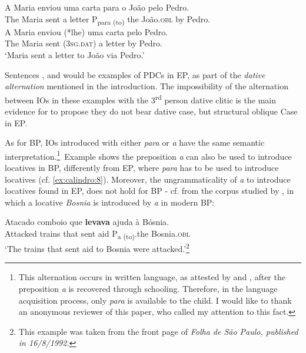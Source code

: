 \documentclass[output=paper,colorlinks,citecolor=brown,modfonts,nonflat]{langsci/langscibook}
\begin{document}
\ea%
    \label{ex:calindro:13}
    \ea\label{ex:calindro:13a}
    \gll A Maria     enviou   uma carta    para o João              pelo Pedro.\\
    The Maria  sent  a letter        P{\textsubscript{para (to)}} {the} {João}.\textsc{obl} by Pedro.\\
    \ex\label{ex:calindro:13b}
    \gll A Maria    enviou (*lhe)  uma carta    pelo Pedro.\\
    The Maria  sent (\textsc{3sg.dat})     a letter         by Pedro.\\
    \glt `Maria sent a letter to João via Pedro.'
    \z
\z

Sentences ,  and  would be examples of PDCs in EP, as part of the \textit{dative alternation} mentioned in the introduction. The impossibility of the alternation between IOs in these examples with the 3\textsuperscript{rd} person dative clitic is the main evidence for \citet{TorresMorais2007} to propose they do not bear dative case, but structural oblique Case in EP.

As for BP, IOs introduced with either \textit{para} or \textit{a} have the same semantic interpretation.\footnote{This alternation occurs in written language, as attested by \citet{Kato2005} and \citet{Calindro2015}, after the preposition \textit{a} is recovered through schooling. Therefore, in the language acquisition process, only \textit{para} is available to the child. I would like to thank an anonymous reviewer of this paper, who called my attention to this fact.}~Example  shows the preposition \textit{a} can also be used to introduce locatives in BP, differently from EP, where \textit{para} has to be used to introduce locatives (cf. \ref{ex:calindro:8}). Moreover, the ungrammaticality of \textit{a} to introduce locatives found in EP, does not hold for BP -  cf.  from the corpus studied by \citet[115]{Calindro2015}, in which a locative \textit{Bosnia} is introduced by \textit{a} in modern BP:

\ea%
    \label{ex:calindro:14}
    \gll Atacado   comboio que \textbf{levava}   ajuda  {à} {Bósnia}.\\
    Attacked  trains       that sent      aid      P{\textsubscript{a (to)}}.the {Bosnia.\textsc{obl}}\\
    \glt ‘The trains that sent aid  to Bosnia were attacked.’\footnote{This example was taken from the front page of \textit{Folha de São Paulo, published in 16/8/1992.}}
    \z
\end{document}
